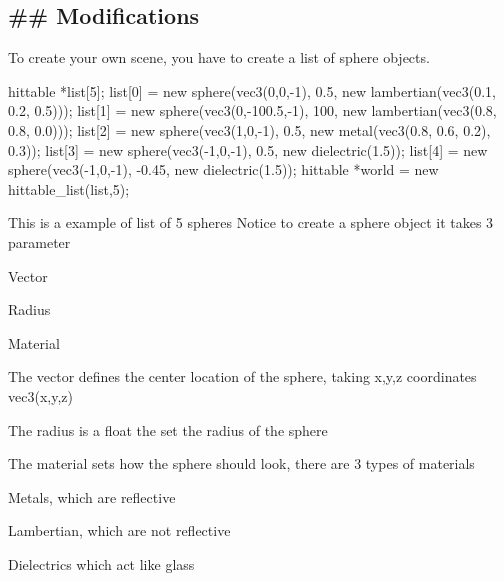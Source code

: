 \subsection*{\#\# Modifications }

To create your own scene, you have to create a list of sphere objects. 
\begin{DoxyCode}
hittable *list[5];
list[0] = new sphere(vec3(0,0,-1), 0.5, new lambertian(vec3(0.1, 0.2, 0.5)));
list[1] = new sphere(vec3(0,-100.5,-1), 100, new lambertian(vec3(0.8, 0.8, 0.0)));
list[2] = new sphere(vec3(1,0,-1), 0.5, new metal(vec3(0.8, 0.6, 0.2), 0.3));
list[3] = new sphere(vec3(-1,0,-1), 0.5, new dielectric(1.5));
list[4] = new sphere(vec3(-1,0,-1), -0.45, new dielectric(1.5));
hittable *world = new hittable\_list(list,5);
\end{DoxyCode}
 This is a example of list of 5 spheres Notice to create a sphere object it takes 3 parameter
\begin{DoxyEnumerate}
\item Vector
\item Radius
\item Material
\end{DoxyEnumerate}

The vector defines the center location of the sphere, taking x,y,z coordinates {\ttfamily vec3(x,y,z)}

The radius is a float the set the radius of the sphere

The material sets how the sphere should look, there are 3 types of materials
\begin{DoxyEnumerate}
\item Metals, which are reflective
\item Lambertian, which are not reflective
\item Dielectrics which act like glass 
\end{DoxyEnumerate}